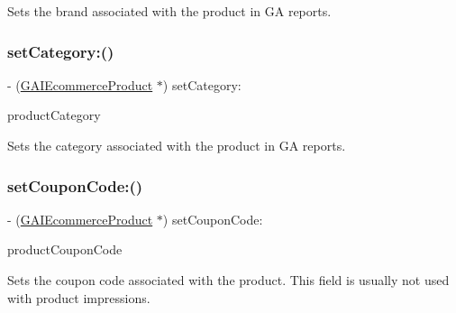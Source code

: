 Sets the brand associated with the product in GA reports. \mbox{\label{interface_g_a_i_ecommerce_product_a82cb537f595d2c93390fd2b8c0ffa223}} 
\subsubsection{\texorpdfstring{set\+Category\+:()}{setCategory:()}}
{\footnotesize\ttfamily -\/ (\hyperlink{interface_g_a_i_ecommerce_product}{G\+A\+I\+Ecommerce\+Product} $\ast$) set\+Category\+: \begin{DoxyParamCaption}\item[{(N\+S\+String $\ast$)}]{product\+Category }\end{DoxyParamCaption}}

Sets the category associated with the product in GA reports. \mbox{\label{interface_g_a_i_ecommerce_product_a2be17ca76aedd7b6856cb4d7085da559}} 
\subsubsection{\texorpdfstring{set\+Coupon\+Code\+:()}{setCouponCode:()}}
{\footnotesize\ttfamily -\/ (\hyperlink{interface_g_a_i_ecommerce_product}{G\+A\+I\+Ecommerce\+Product} $\ast$) set\+Coupon\+Code\+: \begin{DoxyParamCaption}\item[{(N\+S\+String $\ast$)}]{product\+Coupon\+Code }\end{DoxyParamCaption}}

Sets the coupon code associated with the product. This field is usually not used with product impressions. \mbox{\label{interface_g_a_i_ecommerce_product_a6e821c684506319ae670ca936ab6ed0c}} 
